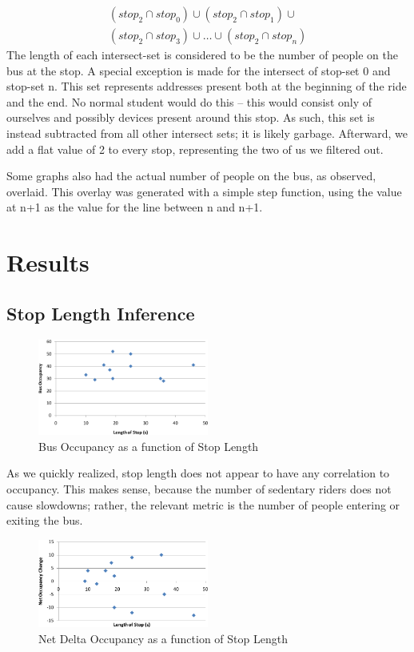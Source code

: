 \documentclass[11pt,journal,compsoc]{IEEEtran} %
\begin{document}
\begin{itemize}
\begin{multline*}
      \left(stop_2 \cap stop_0\right) \cup \left(stop_2 \cap stop_1\right) \cup \\
      \left(stop_2 \cap stop_3\right) \cup \dots \cup \left(stop_2 \cap stop_n\right)
      \end{multline*}
      The length of each intersect-set is considered to be the number of people on the bus at the stop.
      A special exception is made for the intersect of stop-set 0 and stop-set n.
      This set represents addresses present both at the beginning of the ride and the end.
      No normal student would do this -- this would consist only of ourselves and possibly devices present around this stop.
      As such, this set is instead subtracted from all other intersect sets; it is likely garbage.
      Afterward, we add a flat value of 2 to every stop, representing the two of us we filtered out.
    \end{itemize}
    Some graphs also had the actual number of people on the bus, as observed, overlaid.
    This overlay was generated with a simple step function, using the value at n+1 as the value for the line between n and n+1.

\pagebreak

\section{Results}

\subsection*{Stop Length Inference}
	\begin{figure}[!t]
      \includegraphics[width=0.5\textwidth]{occupancy}
      \caption{Bus Occupancy as a function of Stop Length}
	\end{figure}
	As we quickly realized, stop length does not appear to have any correlation to occupancy.
	This makes sense, because the number of sedentary riders does not cause slowdowns; rather, the relevant metric is the number of people entering or exiting the bus.

	\begin{figure}[!t]
	  \includegraphics[width=0.5\textwidth]{netdelta}
      \caption{Net Delta Occupancy as a function of Stop Length}
	\end{figure}
\end{document}
